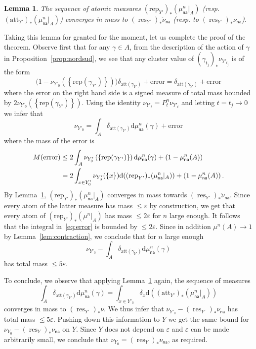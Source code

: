 \documentclass[11pt]{article}
\newtheorem{lemm}[theo]{Lemma}
\theoremstyle{definition}
\numberwithin{equation}{section}
\numberwithin{figure}{section}
\numberwithin{table}{section}
\DeclareMathOperator{\res}{res}
\newcommand{\Rep}{\mathrm{rep}}
\newcommand{\Att}{\mathrm{att}}
\newcommand{\e}{\varepsilon}
\newcommand{\cv}{\rightarrow}
\newcommand{\set}[1]{\left\{#1\right\}}
\newcommand{\m}{\textbf{M}}
\newcommand{\lrpar}[1]{\left(#1\right)}
\newcommand{\att}{\mathrm{att}}
\newcommand{\rep}{\mathrm{rep}}
\newcommand{\na}{\mathsf{na}}
\newcommand*{\dd}{\mathrm{d}}
\newcommand*{\dmu}{\dd \mu}
\begin{document}
\begin{lemm}\label{lem:distrib rep-att}
The sequence of atomic measures $(\Rep_{Y'})_*(\mu^n_\na|_{A}) $ (resp.\linebreak $(\Att_{Y'})_*(\mu^n_\na|_{A}) $) converges in mass to $(\res_{Y'})_*\check\nu_\na$ (resp. to $(\res_{Y'})_*\nu_\na$).
\end{lemm}

Taking this lemma for granted for the moment, let us complete the proof of the theorem. Observe first that for any $\gamma \in A$, from the description of the action of $\gamma$ in Proposition~\ref{prop:nordsud}, we see that any cluster value of $(\gamma_{t_j})_*\nu_{Y'_{t_j}}$ is of the form
\[
\big(1- \nu_{Y'_0}\lrpar{\set{\rep(\gamma_{Y'})}}\big) \delta_{\att(\gamma_{Y'})} + \mathrm{error}
=
\delta_{\att(\gamma_{Y'})} + \mathrm{error}
\]
where the error on the right hand side is a signed measure of total mass bounded by $ 2 \nu_{Y'_0}\lrpar{\set{\rep(\gamma_{Y'})}}$. Using the identity $\nu_{Y'_t} = P_t^n\nu_{Y'_t}$ and letting $t=t_j\cv0$ we infer that
\begin{equation}\label{eq:limit stationary}
\nu_{Y'_0} = \int_{A} \delta_{\att(\gamma_{Y'})} \dmu_\na^n(\gamma) + \mathrm{error}
\end{equation}
where the mass of the error is
\begin{align}
\notag \m(\mathrm{error}) & \leq 2 \int_{A} \nu_{Y'_0}\lrpar{\set{\rep(\gamma_{Y'})}} \dmu_\na^n(\gamma) +
\lrpar{1 -\mu_\na^n(A)} \\\label{eq:error}
&= 2 \int_{x\in Y'_0} \nu_{Y'_0}(\{ x \}) \dd \!\left((\Rep_{Y'})_*(\mu_\na^n|_{A})\right)+ \lrpar{1 -\mu_\na^n(A)}.
\end{align}
By Lemma~\ref{lem:distrib rep-att}, $(\Rep_{Y'})_*(\mu_\na^n|_{A})$ converges in mass towards $(\res_{Y'})_*\check\nu_\na$. Since every atom of the latter measure has mass $\le \varepsilon$ by construction, we get that every atom of $(\Rep_{Y'})_*(\mu^n|_{A})$ has mass $\le 2\varepsilon$ for $n$ large enough. It follows that the integral in~\eqref{eq:error} is bounded by $\le 2 \varepsilon$. Since in addition $\mu^n(A) \to 1$ by Lemma~\ref{lem:contraction}, we conclude that for $n$ large enough
\begin{equation}
\nu_{Y'_0} - \int_{A} \delta_{\att(\gamma_{Y'})} \dmu_\na^n(\gamma)
\end{equation}
has total mass $\le 5 \varepsilon$.

To conclude, we observe that applying Lemma~\ref{lem:distrib rep-att} again, the sequence of measures
\[
\int_{A} \delta_{\att(\gamma_{Y'})} \dmu_\na^n(\gamma) = \int_{x\in Y'_0} \delta_x \dd\!\left((\Att_{Y'})_*(\mu_\na^n|_{A})\right)
\]
converges in mass to $(\res_{Y'})_*\nu$. We thus infer that $ \nu_{Y'_0} - (\res_{Y'})_*\nu_\na$ has total mass $\le 5 \varepsilon$. Pushing down this information to $Y$ we get the same bound for $\nu_{Y_0} - (\res_{Y})_*\nu_\na$ on $Y$. Since $Y$ does not depend on $\e$ and $\e$ can be made arbitrarily small, we conclude that $\nu_{Y_0} = (\res_{Y})_*\nu_\na$, as required.
\end{document}
